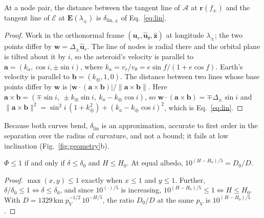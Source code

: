 \documentclass[make,article,submit,moreauthors]{Definitions/mdpi}
\begin{document}
\begin{Lemma}\label{lem:lin}
At a node pair, the distance between the tangent line of $\mathcal{A}$ at $\mathbf{r}(f_\pm)$ and the tangent line of $\mathcal{E}$ at $\mathbf{E}(\lambda_\pm)$ is $\delta_{\mathrm{lin},\pm}$ of Eq.~\eqref{eq:lin}.
\end{Lemma}
\begin{proof}
Work in the orthonormal frame $(\hat{\mathbf{u}}_r, \hat{\mathbf{u}}_\theta, \hat{\mathbf{z}})$ at longitude $\lambda_\pm$; the two points differ by $\mathbf{w} = \Delta_\pm\hat{\mathbf{u}}_r$. The line of nodes is radial there and the orbital plane is tilted about it by $i$, so the asteroid's velocity is parallel to $\mathbf{a} = (k_a, \cos i, \pm\sin i)$, where $k_a = v_r/v_\theta = e\sin f/(1 + e\cos f)$. Earth's velocity is parallel to $\mathbf{b} = (k_\oplus, 1, 0)$. The distance between two lines whose base points differ by $\mathbf{w}$ is $|\mathbf{w}\cdot(\mathbf{a}\times\mathbf{b})|/\lVert\mathbf{a}\times\mathbf{b}\rVert$. Here $\mathbf{a}\times\mathbf{b} = (\mp\sin i,\ \pm k_\oplus\sin i,\ k_a - k_\oplus\cos i)$, so $\mathbf{w}\cdot(\mathbf{a}\times\mathbf{b}) = \mp\Delta_\pm\sin i$ and $\lVert\mathbf{a}\times\mathbf{b}\rVert^2 = \sin^2 i\,(1 + k_\oplus^2) + (k_a - k_\oplus\cos i)^2$, which is Eq.~\eqref{eq:lin}.
\end{proof}
Because both curves bend, $\delta_{\mathrm{lin}}$ is an approximation, accurate to first order in the separation over the radius of curvature, and not a bound; it fails at low inclination (Fig.~\ref{fig:geometry}b).

\begin{Proposition}\label{prop:phi}
$\Phi \le 1$ if and only if $\delta \le \delta_0$ and $H \le H_0$. At equal albedo, $10^{(H - H_0)/5} = D_0/D$.
\end{Proposition}
\begin{proof}
$\max(x, y) \le 1$ exactly when $x \le 1$ and $y \le 1$. Further, $\delta/\delta_0 \le 1 \Leftrightarrow \delta \le \delta_0$, and since $10^{(\cdot)/5}$ is increasing, $10^{(H - H_0)/5} \le 1 \Leftrightarrow H \le H_0$. With $D = 1329\,\mathrm{km}\;p_V^{-1/2}\,10^{-H/5}$, the ratio $D_0/D$ at the same $p_V$ is $10^{(H - H_0)/5}$.
\end{proof}
\end{document}
